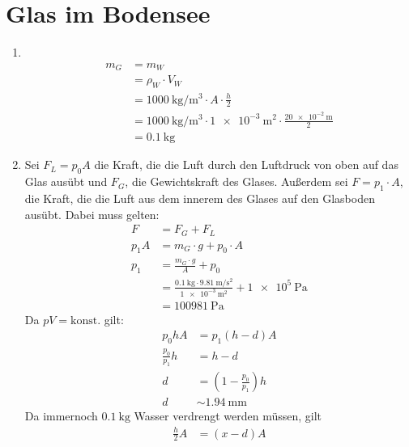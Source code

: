 \documentclass[sectionformat=aufgabe]{gadsescript}
\begin{document}
\maketitle

\section{Glas im Bodensee}
\begin{enumerate}[label=\alph*)]
	\item ~
		\begin{align*}
			m_G &= m_W \\
			    &= \rho_W \cdot V_W \\
			    &= \qty{ 1000 }{ \kilogram\per\cubic\metre } \cdot A \cdot \frac{ h }{ 2 } \\
			    &= \qty{ 1000 }{ \kilogram\per\cubic\metre } \cdot \qty{ 1e-3}{ \square\metre } \cdot \frac{\qty{ 20e-2 }{ \metre }}{ 2 } \\
			    &= \qty{ 0.1 }{ \kilogram } 
		\end{align*}
	\item Sei $ F_L  = p_0 A$ die Kraft, die die Luft durch den Luftdruck von oben auf das Glas ausübt und $ F_G $, die Gewichtskraft des Glases. Außerdem sei $ F = p_1 \cdot A $, die Kraft, die die Luft aus dem innerem des Glases auf den Glasboden ausübt.
		Dabei muss gelten:
		\begin{align*}
			F &= F_G + F_L \\
			p_1 A &= m_G \cdot g + p_0 \cdot A \\
			p_1 &= \frac{ m_G \cdot g }{ A } + p_0 \\
			    &= \frac{ \qty{ 0.1 }{ \kilogram } \cdot \qty{ 9.81 }{ \metre\per\square\second } }{ \qty{ 1e-3 }{ \square\metre }  } + \qty{ 1e5 }{ \pascal } \\
			    &= \qty{ 100981 }{ \pascal }
		\end{align*}
		Da $ pV = \text{konst.}  $ gilt:
		\begin{align*}
			p_0 h A &= p_1 (h-d) A \\
			\frac{p_0}{ p_1 } h &= h - d \\
			d &= \left( 1 - \frac{ p_0 }{ p_1 } \right) h \\
			d &\sim \qty{ 1.94 }{ \milli\metre } 
		\end{align*}
		Da immernoch $ \qty{ 0.1 }{ \kilogram }  $ Wasser verdrengt werden müssen, gilt 
		\begin{align*}
			\frac{ h }{ 2 } A &= ( x - d ) A \\

\end{align*}
\end{enumerate}
\end{document}
